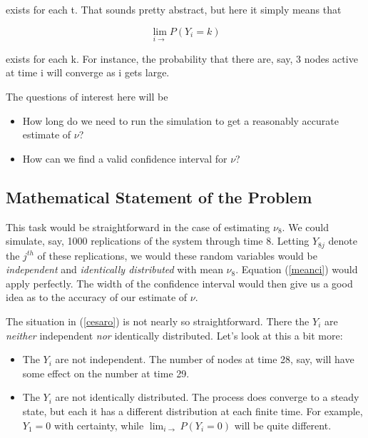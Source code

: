 exists for each t.  That sounds pretty abstract, but here it simply
means that

\begin{equation}
\label{pyik}
\lim_{i \rightarrow} P(Y_i = k)
\end{equation}

exists for each k.  For instance, the probability that there are, say, 3
nodes active at time i will converge as i gets large.

The questions of interest here will be

\begin{itemize}

\item How long do we need to run the simulation to get a reasonably
accurate estimate of $\nu$?

\item How can we find a valid confidence interval for $\nu$?

\end{itemize} 

\subsection{Mathematical Statement of the Problem}

This task would be straightforward in the case of estimating $\nu_8$.
We could simulate, say, 1000 replications of the system through time 8.
Letting $Y_{8j}$ denote the $j^{th}$ of these replications, we would
these random variables would be {\it independent} and {\it identically
distributed} with mean $\nu_8$.  Equation (\ref{meanci}) would apply
perfectly.  The width of the confidence interval would then give us a
good idea as to the accuracy of our estimate of $\nu$.

The situation in (\ref{cesaro}) is not nearly so straightforward.  There
the $Y_i$ are {\it neither} independent {\it nor} identically
distributed.  Let's look at this a bit more:

\begin{itemize} 

\item The $Y_i$ are not independent.  The number of nodes at time 28,
say, will have some effect on the number at time 29.

\item The $Y_i$ are not identically distributed.  The process does
converge to a steady state, but each it has a different distribution at
each finite time.  For example, $Y_1 = 0$ with certainty, while $\lim_{i
\rightarrow} P(Y_i = 0)$ will be quite different.

\end{itemize}

